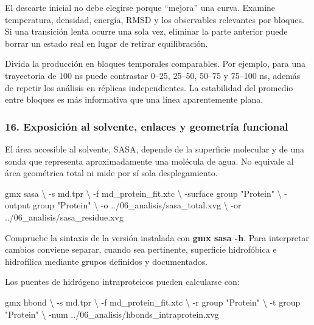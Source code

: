 \documentclass[
  spanish,
  11pt,
  a4paper]{article}
\newenvironment{Shaded}{\begin{snugshade}}{\end{snugshade}}
\newcommand{\AttributeTok}[1]{\textcolor[rgb]{0.13,0.29,0.53}{#1}}
\newcommand{\DataTypeTok}[1]{\textcolor[rgb]{0.13,0.29,0.53}{#1}}
\newcommand{\ExtensionTok}[1]{#1}
\newcommand{\NormalTok}[1]{#1}
\newcommand{\StringTok}[1]{\textcolor[rgb]{0.31,0.60,0.02}{#1}}
\begin{document}
El descarte inicial no debe elegirse porque ``mejora'' una curva.
Examine temperatura, densidad, energía, RMSD y los observables
relevantes por bloques. Si una transición lenta ocurre una sola vez,
eliminar la parte anterior puede borrar un estado real en lugar de
retirar equilibración.

Divida la producción en bloques temporales comparables. Por ejemplo,
para una trayectoria de 100 ns puede contrastar 0--25, 25--50, 50--75 y
75--100 ns, además de repetir los análisis en réplicas independientes.
La estabilidad del promedio entre bloques es más informativa que una
línea aparentemente plana.

\subsubsection{16. Exposición al solvente, enlaces y geometría
funcional}\label{exposiciuxf3n-al-solvente-enlaces-y-geometruxeda-funcional}

El área accesible al solvente, SASA, depende de la superficie molecular
y de una sonda que representa aproximadamente una molécula de agua. No
equivale al área geométrica total ni mide por sí sola desplegamiento.

\begin{Shaded}
\begin{Highlighting}[]
\ExtensionTok{gmx}\NormalTok{ sasa }\DataTypeTok{\textbackslash{}}
    \AttributeTok{{-}s}\NormalTok{ md.tpr }\DataTypeTok{\textbackslash{}}
    \AttributeTok{{-}f}\NormalTok{ md\_protein\_fit.xtc }\DataTypeTok{\textbackslash{}}
    \AttributeTok{{-}surface} \StringTok{\textquotesingle{}group "Protein"\textquotesingle{}} \DataTypeTok{\textbackslash{}}
    \AttributeTok{{-}output} \StringTok{\textquotesingle{}group "Protein"\textquotesingle{}} \DataTypeTok{\textbackslash{}}
    \AttributeTok{{-}o}\NormalTok{ ../06\_analisis/sasa\_total.xvg }\DataTypeTok{\textbackslash{}}
    \AttributeTok{{-}or}\NormalTok{ ../06\_analisis/sasa\_residue.xvg}
\end{Highlighting}
\end{Shaded}

Compruebe la sintaxis de la versión instalada con \textbf{gmx sasa -h}.
Para interpretar cambios conviene separar, cuando sea pertinente,
superficie hidrofóbica e hidrofílica mediante grupos definidos y
documentados.

Los puentes de hidrógeno intraproteicos pueden calcularse con:

\begin{Shaded}
\begin{Highlighting}[]
\ExtensionTok{gmx}\NormalTok{ hbond }\DataTypeTok{\textbackslash{}}
    \AttributeTok{{-}s}\NormalTok{ md.tpr }\DataTypeTok{\textbackslash{}}
    \AttributeTok{{-}f}\NormalTok{ md\_protein\_fit.xtc }\DataTypeTok{\textbackslash{}}
    \AttributeTok{{-}r} \StringTok{\textquotesingle{}group "Protein"\textquotesingle{}} \DataTypeTok{\textbackslash{}}
    \AttributeTok{{-}t} \StringTok{\textquotesingle{}group "Protein"\textquotesingle{}} \DataTypeTok{\textbackslash{}}
    \AttributeTok{{-}num}\NormalTok{ ../06\_analisis/hbonds\_intraprotein.xvg}
\end{Highlighting}
\end{Shaded}
\end{document}
